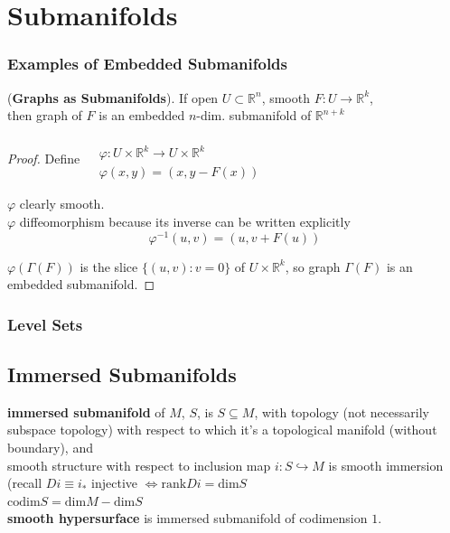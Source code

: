 \section{Submanifolds}

\subsubsection*{Examples of Embedded Submanifolds }

\begin{lemma}[8.6] (\textbf{Graphs as Submanifolds}). 
If open $U \subset \mathbb{R}^n$, smooth $F: U \to \mathbb{R}^k$, \\
then graph of $F$ is an embedded $n$-dim. submanifold of $\mathbb{R}^{n+k}$
\end{lemma}

\begin{proof}
  Define $\begin{aligned} 
    & \quad \\
    & \varphi: U \times \mathbb{R}^k \to U \times \mathbb{R}^k \\ 
    & \varphi(x,y) = (x,y - F(x)) \end{aligned}$

$\varphi$ clearly smooth. \\
$\varphi$ diffeomorphism because its inverse can be written explicitly
\[
\varphi^{-1}(u,v) = (u ,  v + F(u))
\]

$\varphi( \Gamma(F))$ is the slice $\lbrace (u,v) : v = 0 \rbrace $ of $U\times \mathbb{R}^k$, so graph $\Gamma(F)$ is an embedded submanifold.  



\end{proof}



\subsubsection*{Level Sets}


\subsection*{Immersed Submanifolds}

\begin{definition}
  \textbf{immersed submanifold } of $M$, $S$, is $S\subseteq M$, with topology (not necessarily subspace topology) with respect to which it's a topological manifold (without boundary), and \\
\phantom{ \quad \quad \, }   smooth structure with respect to inclusion map $i : S \hookrightarrow M$ is smooth immersion (recall $Di \equiv i_*$ injective $\Longleftrightarrow \text{rank}Di = \text{dim}S$ \\

$\text{codim}S = \text{dim}M - \text{dim}S$ \\

\textbf{smooth hypersurface} is immersed submanifold of codimension $1$.  
\end{definition}
